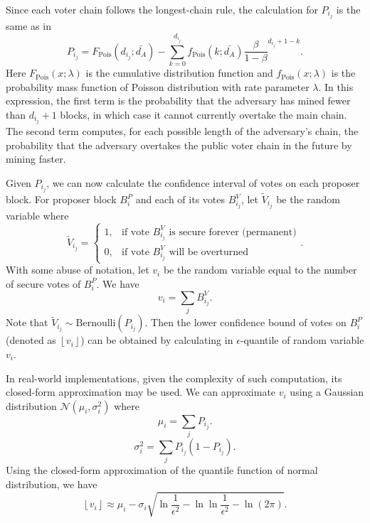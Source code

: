 Since each voter chain follows the longest-chain rule, the calculation for $P_{i_j}$ is the same as in \bitcoin
$$P_{i_j} = F_{\text{Pois}}(d_{i_j};\bar{d_A}) - \sum_{k=0}^{d_{i_j}}f_{\text{Pois}}(k;\bar{d_A})\frac{\beta}{1-\beta}^{d_{i_j} + 1 - k}.$$
Here $F_{\text{Pois}}(x;\lambda)$ is the cumulative distribution function and $f_{\text{Pois}}(x;\lambda)$ is the probability mass function of Poisson distribution with rate parameter $\lambda$.
In this expression, the first term is the probability that the adversary has mined fewer than $d_{i_j}+1$ blocks, in which case it cannot currently overtake the main chain. 
The second term computes, for each possible length of the adversary's chain, the probability that the adversary overtakes the public voter chain in the future by mining faster. 

Given $P_{i_j}$, we can now calculate the confidence interval of votes on each proposer block. For proposer block $B_i^P$ and each of its votes $B^V_{i_j}$, let $\tilde V_{i_j}$ be the random variable where
$$\tilde V_{i_j} = \begin{cases}
    1, & \text{if vote } B^V_{i_j} \text{ is secure forever (permanent)} \\
    0, & \text{if vote } B^V_{i_j} \text{ will be overturned}
  \end{cases}.$$
With some abuse of notation, let $v_i$ be the random variable equal to the number of secure votes of $B^P_i$. We have
$$v_i = \sum_{j}B^V_{i_j}.$$
Note that $\tilde V_{i_j}\sim \text{Bernoulli}(P_{i_j})$. Then the lower confidence bound of votes on $B_i^P$ (denoted as $\left \lfloor v_{i} \right \rfloor$) can be obtained by calculating in $\epsilon$-quantile of random variable $v_i$.

In real-world implementations, given the complexity of such computation, its closed-form approximation may be used. We can approximate $v_i$ using a Gaussian distribution $\mathcal N(\mu_i, \sigma_i^2)$ where
$$\mu_i=\sum_j P_{i_j}.$$
$$\sigma_i^2 = \sum_j P_{i_j}(1-P_{i_j}).$$
Using the closed-form approximation of the quantile function of normal distribution, we have
$$\left \lfloor v_{i} \right \rfloor \approx \mu_i - \sigma_i \sqrt{\ln{
\frac{1}{\epsilon^2}} - \ln{\ln{\frac{1}{\epsilon^2}}} - \ln{(2\pi)}}.$$

